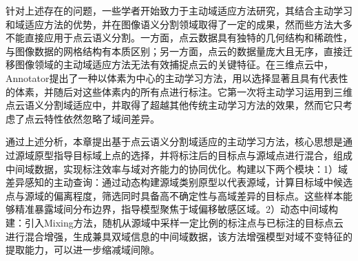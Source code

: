 针对上述存在的问题，一些学者开始致力于主动域适应方法研究，其结合主动学习和域适应方法的优势，并在图像语义分割领域取得了一定的成果，然而些方法大多不能直接应用于点云语义分割。一方面，点云数据具有独特的几何结构和稀疏性，与图像数据的网格结构有本质区别；另一方面，点云的数据量庞大且无序，直接迁移图像领域的主动域适应方法无法有效捕捉点云的关键特征。在三维点云中，Annotator提出了一种以体素为中心的主动学习方法，用以选择显著且具有代表性的体素，并随后对这些体素内的所有点进行标注。它第一次将主动学习运用到三维点云语义分割域适应中，并取得了超越其他传统主动学习方法的效果，然而它只考虑了点云特性依然忽略了域间差异。


通过上述分析，本章提出基于点云语义分割域适应的主动学习方法，核心思想是通过源域原型指导目标域上点的选择，并将标注后的目标点与源域点进行混合，组成中间域数据，实现标注效率与域对齐能力的协同优化。构建以下两个模块：1）域差异感知的主动查询：通过动态构建源域类别原型以代表源域，计算目标域中候选点与源域的偏离程度，筛选同时具备高不确定性与高域差异的目标点。这些样本能够精准暴露域间分布边界，指导模型聚焦于域偏移敏感区域。2）动态中间域构建：引入Mixing方法，随机从源域中采样一定比例的标注点与已标注的目标点云进行混合增强，生成兼具双域信息的中间域数据，该方法增强模型对域不变特征的提取能力，可以进一步缩减域间隙。




